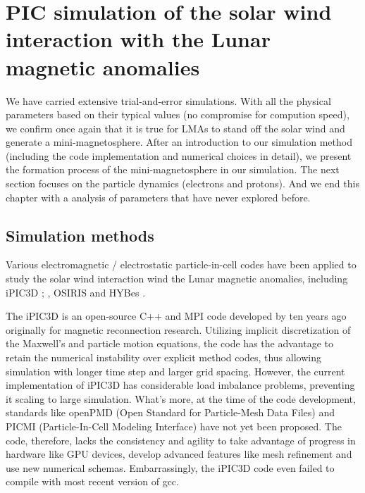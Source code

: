 
\chapter{PIC simulation of the solar wind interaction with the Lunar magnetic anomalies}

We have carried extensive trial-and-error simulations. With all the physical parameters based on their typical values (no compromise for compution speed), we confirm once again \citep{decaGeneralMechanismDynamics2015, bamford3DPICSIMULATIONS2016} that it is true for LMAs to stand off the solar wind and generate a mini-magnetosphere. After an introduction to our simulation method (including the code implementation and numerical choices in detail), we present the formation process of the mini-magnetosphere in our simulation. The next section focuses on the particle dynamics (electrons and protons). And we end this chapter with a analysis of parameters that have never explored before.


\section{Simulation methods}

Various electromagnetic / electrostatic particle-in-cell codes have been applied to study the solar wind interaction wind the Lunar magnetic anomalies, including iPIC3D \citep{decaPlasmaEnvironmentSurrounding2021}; \cite{decaGeneralMechanismDynamics2015}, OSIRIS \citep{bamford3DPICSIMULATIONS2016} and HYBes \citep{dyadechkinNewFullyKinetic2015}.

The iPIC3D is an open-source C++ and MPI code developed by \cite{markidisMultiscaleSimulationsPlasma2010} ten years ago originally for magnetic reconnection research. Utilizing implicit discretization of the Maxwell's and particle motion equations, the code has the advantage to retain the numerical instability over explicit method codes, thus allowing simulation with longer time step and larger grid spacing. However, the current implementation of iPIC3D has considerable load imbalance problems, preventing it scaling to large simulation. What's more, at the time of the code development, standards like openPMD (Open Standard for Particle-Mesh Data Files) and PICMI (Particle-In-Cell Modeling Interface) have not yet been proposed. The code, therefore, lacks the consistency and agility to take advantage of progress in hardware like GPU devices, develop advanced features like mesh refinement and use new numerical schemas. Embarrassingly, the iPIC3D code even failed to compile with most recent version of gcc.

